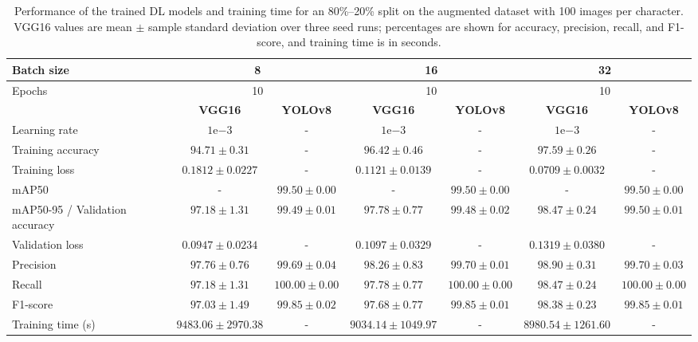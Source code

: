 \begin{table}[]
    \centering
    \caption{Performance of the trained DL models and training time for an 80\%--20\% split on the augmented dataset with 100 images per character. VGG16 values are mean $\pm$ sample standard deviation over three seed runs; percentages are shown for accuracy, precision, recall, and F1-score, and training time is in seconds.}
    \vspace{0.8em}
    \begin{tabular}{|l|c|c|c|c|c|c|}
    \hline
        Batch size & \multicolumn{2}{c|}{8} & \multicolumn{2}{c|}{16} & \multicolumn{2}{c|}{32} \\
    \hline
        Epochs & \multicolumn{2}{c|}{10} & \multicolumn{2}{c|}{10} & \multicolumn{2}{c|}{10} \\
    \hline
         & \textbf{VGG16} & \textbf{YOLOv8} & \textbf{VGG16} & \textbf{YOLOv8} & \textbf{VGG16} & \textbf{YOLOv8} \\
    \hline
        Learning rate & $1\mathrm{e}{-3}$ & - & $1\mathrm{e}{-3}$ & - & $1\mathrm{e}{-3}$ & - \\
        Training accuracy & $94.71 \pm 0.31$ & - & $96.42 \pm 0.46$ & - & $97.59 \pm 0.26$ & - \\
        Training loss & $0.1812 \pm 0.0227$ & - & $0.1121 \pm 0.0139$ & - & $0.0709 \pm 0.0032$ & - \\
        mAP50 & - & $99.50 \pm 0.00$ & - & $99.50 \pm 0.00$ & - & $99.50 \pm 0.00$ \\
        mAP50-95 / Validation accuracy & $97.18 \pm 1.31$ & $99.49 \pm 0.01$ & $97.78 \pm 0.77$ & $99.48 \pm 0.02$ & $98.47 \pm 0.24$ & $99.50 \pm 0.01$ \\
        Validation loss & $0.0947 \pm 0.0234$ & - & $0.1097 \pm 0.0329$ & - & $0.1319 \pm 0.0380$ & - \\
        Precision & $97.76 \pm 0.76$ & $99.69 \pm 0.04$ & $98.26 \pm 0.83$ & $99.70 \pm 0.01$ & $98.90 \pm 0.31$ & $99.70 \pm 0.03$ \\
        Recall & $97.18 \pm 1.31$ & $100.00 \pm 0.00$ & $97.78 \pm 0.77$ & $100.00 \pm 0.00$ & $98.47 \pm 0.24$ & $100.00 \pm 0.00$ \\
        F1-score & $97.03 \pm 1.49$ & $99.85 \pm 0.02$ & $97.68 \pm 0.77$ & $99.85 \pm 0.01$ & $98.38 \pm 0.23$ & $99.85 \pm 0.01$ \\
        Training time (s) & $9483.06 \pm 2970.38$ & - & $9034.14 \pm 1049.97$ & - & $8980.54 \pm 1261.60$ & - \\
    \hline
    \end{tabular}
\end{table}
